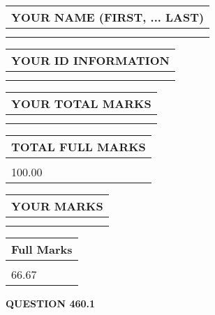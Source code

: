 \documentclass{ctexart}
\begin{document}
   
   
   
\newpage 
\setcounter{page}{ 
   460001 } 
   
   
   
   
\noindent\begin{tabular}{|l|}
\hline
YOUR NAME (FIRST, ... LAST)  \\
\hline
 \\ 
 \\ 
\hline
\end{tabular}
\hspace{0.05in} \begin{tabular}{|l|}
\hline
 YOUR   ID   INFORMATION  \\
\hline
 \\ 
 \\ 
\hline
\end{tabular}
   
   
\vspace{0.2in}\noindent\begin{tabular}{|l|}
\hline
YOUR TOTAL MARKS  \\
\hline
 \\ 
 \\ 
\hline
\end{tabular}
\hspace{0.05in} \begin{tabular}{|l|}
\hline
TOTAL FULL MARKS  \\
\hline
 \\ 
100.00 \\
\hline
\end{tabular}
   
   
 \vspace{0.2in}
 
 
 
 
   
   
  
\vspace{0.2in}
  
\noindent\begin{tabular}{|l|}
\hline
 YOUR MARKS  \\
\hline
 \\ 
 \\ 
\hline
\end{tabular}
\hspace{0.05in} \begin{tabular}{|l|}
\hline
 Full Marks  \\
\hline
 \\ 
66.67 \\
\hline
\end{tabular}
{\textbf{\Large{QUESTION
460.1 
}}}
  
\end{document}
